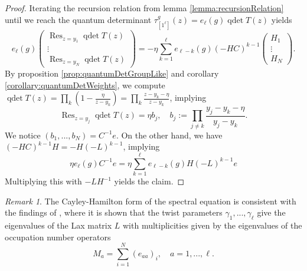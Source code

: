 \documentclass[11pt]{report}
\newtheorem{corollary}[theorem]{Corollary}
\theoremstyle{definition}
\theoremstyle{remark}
\newtheorem*{remark}{Remark}
\theoremstyle{remark}
\begin{document}
\begin{proof}
Iterating the recursion relation from lemma \ref{lemma:recursionRelation} until we reach the quantum determinant $\tau_{[1^\ell]}^g(z) = e_\ell(g) \operatorname{qdet} T(z)$ yields
\begin{equation*}
e_\ell(g)
\begin{pmatrix}
\operatorname{Res}_{z=y_1} \operatorname{qdet} T(z) \\ \vdots \\ \operatorname{Res}_{z=y_N} \operatorname{qdet} T(z)
\end{pmatrix}
= -\eta \sum_{k=1}^\ell e_{\ell-k}(g) (-HC)^{k-1}
\begin{pmatrix}
H_1 \\ \vdots \\ H_N
\end{pmatrix}.
\end{equation*}
By proposition \ref{prop:quantumDetGroupLike} and corollary \ref{corollary:quantumDetWeights}, we compute $\operatorname{qdet} T(z) = \prod_k \left( 1-\frac{\eta}{z-y_k} \right) = \prod_k \frac{z-y_k-\eta}{z-y_k}$, implying
\begin{equation*}
\operatorname{Res}_{z=y_j} \operatorname{qdet} T(z) = \eta b_j, \quad b_j := \prod_{j \neq k} \frac{y_j-y_k-\eta}{y_j-y_k}.
\end{equation*}
We notice $(b_1,...,b_N) = C^{-1} e$. On the other hand, we have $(-HC)^{k-1} H = -H(-L)^{k-1}$, implying
\begin{equation*}
\eta e_\ell(g) C^{-1} e = \eta \sum_{k=1}^\ell e_{\ell-k}(g) H(-L)^{k-1} e
\end{equation*}
Multiplying this with $-LH^{-1}$ yields the claim.
\end{proof}

\begin{remark}
The Cayley-Hamilton form of the spectral equation is consistent with the findings of \cite{article:gorsky:2014}, where it is shown that the twist parameters $\gamma_1,...,\gamma_\ell$ give the eigenvalues of the Lax matrix $L$ with multiplicities given by the eigenvalues of the occupation number operators
\begin{equation}\label{equation:occupationNumber}
M_a = \sum_{i=1}^N (e_{aa})_i, \quad a=1,...,\ell.
\end{equation}
\end{remark}

%
%
\end{document}
